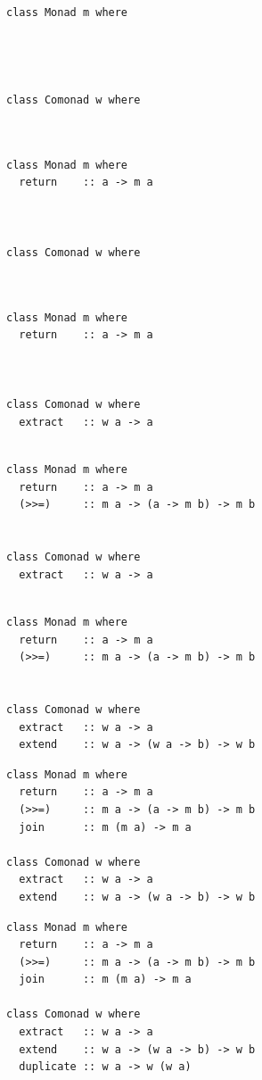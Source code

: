 \documentclass{beamer}
\begin{document}
\begin{frame}[fragile]
  \begin{overprint}
    \begin{verbatim}
class Monad m where




class Comonad w where



    \end{verbatim}
    \begin{verbatim}
class Monad m where
  return    :: a -> m a



class Comonad w where



    \end{verbatim}
    \begin{verbatim}
class Monad m where
  return    :: a -> m a



class Comonad w where
  extract   :: w a -> a


    \end{verbatim}
    \begin{verbatim}
class Monad m where
  return    :: a -> m a
  (>>=)     :: m a -> (a -> m b) -> m b


class Comonad w where
  extract   :: w a -> a


    \end{verbatim}
    \begin{verbatim}
class Monad m where
  return    :: a -> m a
  (>>=)     :: m a -> (a -> m b) -> m b


class Comonad w where
  extract   :: w a -> a
  extend    :: w a -> (w a -> b) -> w b

    \end{verbatim}
    \begin{verbatim}
class Monad m where
  return    :: a -> m a
  (>>=)     :: m a -> (a -> m b) -> m b
  join      :: m (m a) -> m a

class Comonad w where
  extract   :: w a -> a
  extend    :: w a -> (w a -> b) -> w b

    \end{verbatim}
    \begin{verbatim}
class Monad m where
  return    :: a -> m a
  (>>=)     :: m a -> (a -> m b) -> m b
  join      :: m (m a) -> m a

class Comonad w where
  extract   :: w a -> a
  extend    :: w a -> (w a -> b) -> w b
  duplicate :: w a -> w (w a)
    \end{verbatim}
    \end{overprint}
\end{frame}
\end{document}
